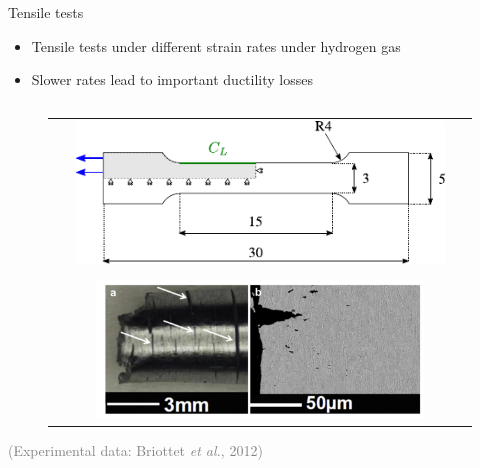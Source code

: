 \documentclass[9pt]{beamer}
\begin{document}
\begin{frame}{Tensile tests}

    \begin{itemize}
        \item Tensile tests under different strain rates under hydrogen gas
        \vspace{0.15cm}
        \item Slower rates lead to important ductility losses
    \end{itemize}
    
    \begin{columns}
    
        \begin{column}{0.45\textwidth}
            \begin{figure}
                \begin{tabular}{c}
                    \includegraphics[width=0.9\textwidth]{Images/ST_specimen_Moro_BC.pdf}\\
                    \\
                    \includegraphics[width=0.8\textwidth]{Images/fracture_surface.png}\\
                \end{tabular}
            \end{figure}
            \centering \scriptsize \textcolor{gray}{(Experimental data: Briottet \textit{et al.}, 2012)}
        \end{column}
    

\end{columns}
\end{frame}
\end{document}
